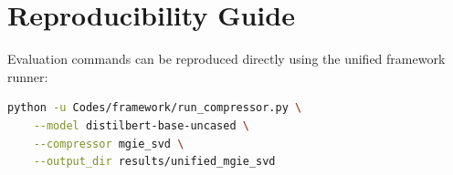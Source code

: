 \section{Reproducibility Guide}
Evaluation commands can be reproduced directly using the unified framework runner:
\begin{lstlisting}[language=bash]
python -u Codes/framework/run_compressor.py \
    --model distilbert-base-uncased \
    --compressor mgie_svd \
    --output_dir results/unified_mgie_svd
\end{lstlisting}
